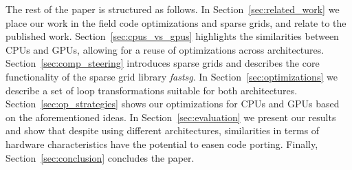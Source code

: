 The rest of the paper is structured as follows. In
Section~\ref{sec:related_work} we place our work in the field code optimizations
and sparse grids, and relate to the published work.
Section~\ref{sec:cpus_vs_gpus} highlights the similarities between CPUs and
GPUs, allowing for a reuse of optimizations across architectures.
Section~\ref{sec:comp_steering} introduces sparse grids and describes the core
functionality of the sparse grid library \textit{fastsg}. In
Section~\ref{sec:optimizations} we describe a set of loop transformations
suitable for both architectures. Section~\ref{sec:op_strategies} shows our
optimizations for CPUs and GPUs based on the aforementioned ideas. In
Section~\ref{sec:evaluation} we present our results and show that despite using
different architectures, similarities in terms of hardware characteristics have
the potential to easen code porting. Finally, Section~\ref{sec:conclusion}
concludes the paper.
